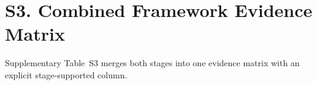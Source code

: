 \section{S3. Combined Framework Evidence Matrix}

Supplementary Table~S3 merges both stages into one evidence matrix with an explicit stage-supported column.



